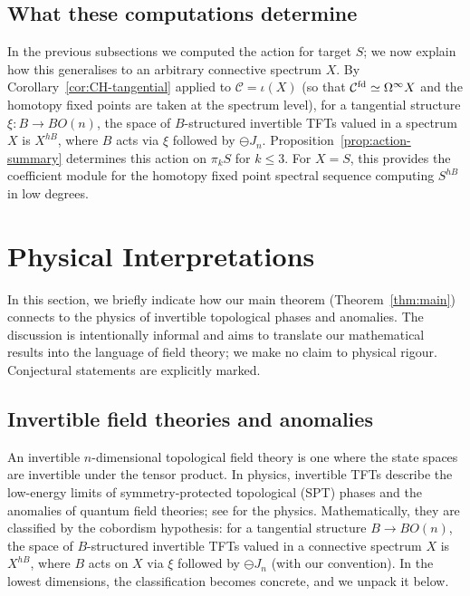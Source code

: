 \documentclass{amsart}
\begin{document}
\subsection{What these computations determine}

In the previous subsections we computed the action for target $S$; we now explain how this generalises to an arbitrary connective spectrum $X$.
By Corollary~\ref{cor:CH-tangential} applied to $\mathcal{C} = \iota(X)$ (so that $\mathcal{C}^{\mathrm{fd}} \simeq \Omega^\infty X$ and the homotopy fixed points are taken at the spectrum level), for a tangential structure $\xi\colon B \to BO(n)$, the space of $B$-structured invertible TFTs valued in a spectrum $X$ is $X^{hB}$, where $B$ acts via $\xi$ followed by $\ominus J_n$. Proposition~\ref{prop:action-summary} determines this action on $\pi_k {S}$ for $k \le 3$. For $X = {S}$, this provides the coefficient module for the homotopy fixed point spectral sequence computing ${S}^{hB}$ in low degrees.

\section{Physical Interpretations}\label{sec:physics}
In this section, we briefly indicate how our main theorem (Theorem~\ref{thm:main}) connects to the physics of invertible topological phases and anomalies. The discussion is intentionally informal and aims to translate our mathematical results into the language of field theory; we make no claim to physical rigour. Conjectural statements are explicitly marked.

\subsection{Invertible field theories and anomalies}

An invertible $n$-dimensional topological field theory is one where the state spaces are invertible under the tensor product. In physics, invertible TFTs describe the low-energy limits of symmetry-protected topological (SPT) phases and the anomalies of quantum field theories; see \cite{KapustinThorngren, Debray, BeaudryCampbell, Freed} for the physics. Mathematically, they are classified by the cobordism hypothesis: for a tangential structure $B \to BO(n)$, the space of $B$-structured invertible TFTs valued in a connective spectrum $X$ is $X^{hB}$, where $B$ acts on $X$ via $\xi$ followed by $\ominus J_n$ (with our convention). In the lowest dimensions, the classification becomes concrete, and we unpack it below.
\end{document}
